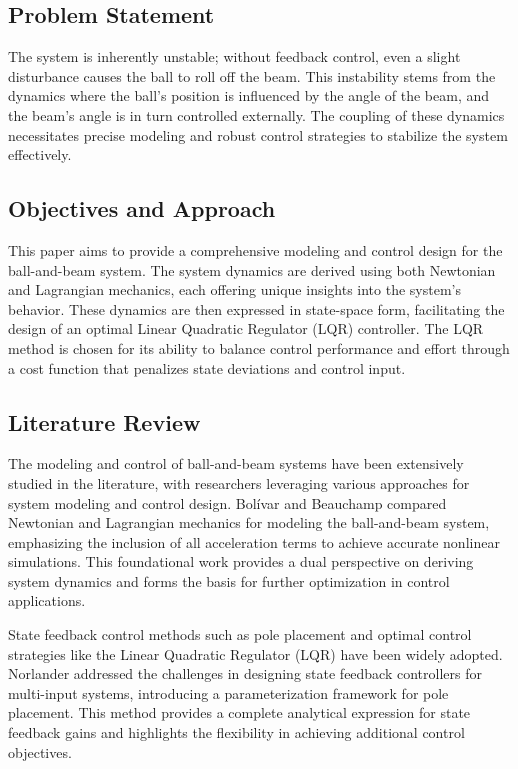 \documentclass[conference]{IEEEtran}
\begin{document}
\subsection{Problem Statement}
\label{subsec:intro_prob_statement}
The system is inherently unstable; without feedback control, even a slight disturbance causes the ball to roll off the beam. This instability stems from the dynamics where the ball's position is influenced by the angle of the beam, and the beam's angle is in turn controlled externally. The coupling of these dynamics necessitates precise modeling and robust control strategies to stabilize the system effectively.

\subsection{Objectives and Approach}
\label{subsec:intro_objective}
This paper aims to provide a comprehensive modeling and control design for the ball-and-beam system. The system dynamics are derived using both Newtonian and Lagrangian mechanics, each offering unique insights into the system's behavior. These dynamics are then expressed in state-space form, facilitating the design of an optimal Linear Quadratic Regulator (LQR) controller. The LQR method is chosen for its ability to balance control performance and effort through a cost function that penalizes state deviations and control input.

\subsection{Literature Review}
\label{subsec:intro_lit_review}
The modeling and control of ball-and-beam systems have been extensively studied in the literature, with researchers leveraging various approaches for system modeling and control design. Bolívar and Beauchamp \cite{bolivar2014} compared Newtonian and Lagrangian mechanics for modeling the ball-and-beam system, emphasizing the inclusion of all acceleration terms to achieve accurate nonlinear simulations. This foundational work provides a dual perspective on deriving system dynamics and forms the basis for further optimization in control applications.

State feedback control methods such as pole placement and optimal control strategies like the Linear Quadratic Regulator (LQR) have been widely adopted. Norlander \cite{norlaner2003} addressed the challenges in designing state feedback controllers for multi-input systems, introducing a parameterization framework for pole placement. This method provides a complete analytical expression for state feedback gains and highlights the flexibility in achieving additional control objectives.
\end{document}
